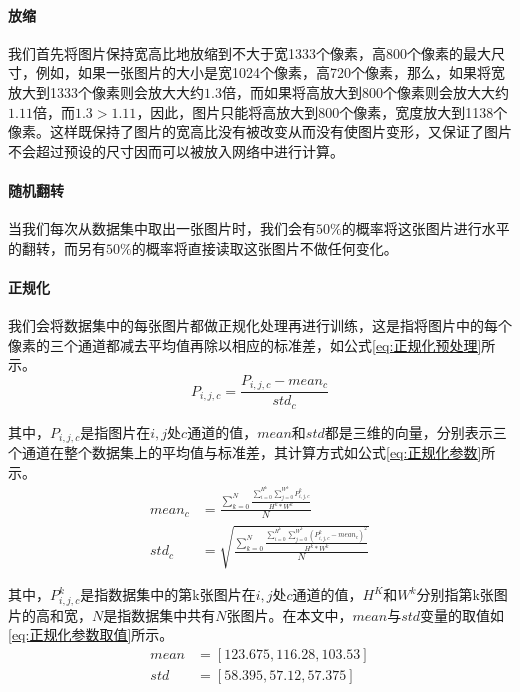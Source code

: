\paragraph{放缩}
\par 我们首先将图片保持宽高比地放缩到不大于宽1333个像素，高800个像素的最大尺寸，例如，如果一张图片的大小是宽1024个像素，高720个像素，那么，如果将宽放大到1333个像素则会放大大约$1.3$倍，而如果将高放大到800个像素则会放大大约$1.11$倍，而$1.3>1.11$，因此，图片只能将高放大到800个像素，宽度放大到1138个像素。这样既保持了图片的宽高比没有被改变从而没有使图片变形，又保证了图片不会超过预设的尺寸因而可以被放入网络中进行计算。
\paragraph{随机翻转}
\par 当我们每次从数据集中取出一张图片时，我们会有$50\%$的概率将这张图片进行水平的翻转，而另有$50\%$的概率将直接读取这张图片不做任何变化。
\paragraph{正规化}
\par 我们会将数据集中的每张图片都做正规化处理再进行训练，这是指将图片中的每个像素的三个通道都减去平均值再除以相应的标准差，如公式\ref{eq:正规化预处理}所示。
\begin{equation}
    P_{i,j,c}=\frac{P_{i,j,c}-mean_{c}}{std_{c}}
    \label{eq:正规化预处理}
\end{equation}

\par 其中，$P_{i,j,c}$是指图片在$i,j$处$c$通道的值，$mean$和$std$都是三维的向量，分别表示三个通道在整个数据集上的平均值与标准差，其计算方式如公式\ref{eq:正规化参数}所示。
\begin{equation}
    \begin{aligned}
        mean_c & =\frac{\sum_{k=0}^N\frac{\sum_{i=0}^{H^k}\sum_{j=0}^{W^k}P_{i,j,c}^k}{H^k*W^k}}{N}                   \\
        std_c  & =\sqrt{\frac{\sum_{k=0}^N\frac{\sum_{i=0}^{H^k}\sum_{j=0}^{W^k}(P_{i,j,c}^k-mean_c)^2}{H^k*W^k}}{N}}
    \end{aligned}
    \label{eq:正规化参数}
\end{equation}

\par 其中，$P_{i,j,c}^k$是指数据集中的第k张图片在$i,j$处$c$通道的值，$H^K$和$W^k$分别指第k张图片的高和宽，$N$是指数据集中共有$N$张图片。在本文中，$mean$与$std$变量的取值如\ref{eq:正规化参数取值}所示。
\begin{equation}
    \begin{aligned}
        mean & =[123.675, 116.28, 103.53] \\
        std  & =[58.395, 57.12, 57.375]
    \end{aligned}
    \label{eq:正规化参数取值}
\end{equation}

